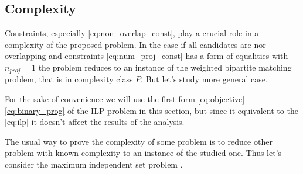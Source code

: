 \subsection{Complexity}
Constraints, especially \eqref{eq:non_overlap_const}, play a crucial role in a complexity
of the proposed problem. In the case if all candidates are nor overlapping and constraints
\eqref{eq:num_proj_const} has a form of equalities with \( n_{proj} = 1 \) the problem reduces to
an instance of the weighted bipartite matching problem, that is in complexity class \( P \). But let's study
more general case.

For the sake of convenience we will use the first form \eqref{eq:objective}--\eqref{eq:binary_prog}
of the ILP problem in this section, but since it equivalent to the \eqref{eq:ilp} it doesn't affect
the results of the analysis.

The usual way to prove the complexity of some problem is to reduce other problem with known complexity to
an instance of the studied one. Thus let's consider the maximum independent set problem \cite{pemmaraju2003computational}.

